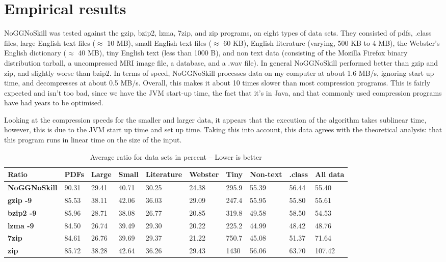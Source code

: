 \documentclass[a4paper]{article}
\begin{document}
\section {Empirical results}
NoGGNoSkill was tested against the gzip, bzip2, lzma, 7zip, and zip programs, on eight types of data sets. They consisted of pdfs, .class files, large English text files ($\approx$ 10 MB), small English text files ($\approx$ 60 KB), English literature (varying, 500 KB to 4 MB), the Webster's English dictionary ($\approx$ 40 MB), tiny English text (less than 1000 B), and non text data (consisting of the Mozilla Firefox binary distribution tarball, a uncompressed MRI image file, a database, and a .wav file). In general NoGGNoSkill performed better than gzip and zip, and slightly worse than bzip2. In terms of speed, NoGGNoSkill processes data on my computer at about 1.6 MB/s, ignoring start up time, and decompresses at about 0.5 MB/s. Overall, this makes it about 10 times slower than most compression programs. This is fairly expected and isn't too bad, since we have the JVM start-up time, the fact that it's in Java, and that commonly used compression programs have had years to be optimised.

Looking at the compression speeds for the smaller and larger data, it appears that the execution of the algorithm takes sublinear time, however, this is due to the JVM start up time and set up time. Taking this into account, this data agrees with the theoretical analysis: that this program runs in linear time on the size of the input. 

\begin{table}[!h]
\centering
\begin{tabular}{| l | l | l | l | l | l | l | l | l | l |}
\hline
\textbf{Ratio} & \textbf{PDFs} & \textbf{Large} & \textbf{Small} & \textbf{Literature} & \textbf{Webster} & \textbf{Tiny} & \textbf{Non-text} & \textbf{.class} & \textbf{All data} \\
\hline
\textbf{NoGGNoSkill} & 90.31 & 29.41 & 40.71 & 30.25 & 24.38 & 295.9 & 55.39 & 56.44 & 55.40 \\
\hline
\textbf{gzip -9} & 85.53 & 38.11 & 42.06 & 36.03 & 29.09 & 247.4 & 55.95 & 55.80 & 55.61 \\
\hline
\textbf{bzip2 -9} & 85.96 & 28.71 & 38.08 & 26.77 & 20.85 & 319.8 & 49.58 & 58.50 & 54.53 \\
\hline
\textbf{lzma -9} & 84.50 & 26.74 & 39.49 & 29.30 & 20.22 & 225.2 & 44.99 & 48.42 & 48.76 \\
\hline
\textbf{7zip} & 84.61 & 26.76 & 39.69 & 29.37 & 21.22 & 750.7 & 45.08 & 51.37 & 71.64 \\
\hline
\textbf{zip} & 85.72 & 38.28 & 42.64 & 36.26 & 29.43 & 1430 & 56.06 & 63.70 & 107.42 \\
\hline
\end{tabular}
\caption{Average ratio for data sets in percent -- Lower is better}
\label{tb:average_ratio}
\end{table}
\end{document}
